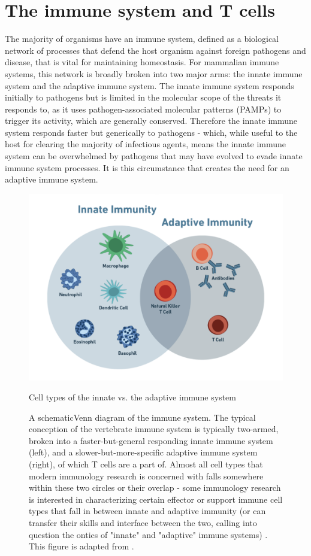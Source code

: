 \section{The immune system and T cells}
The majority of organisms have an immune system, defined as a biological network of processes that defend the host organism against foreign pathogens and disease, that is vital for maintaining homeostasis. For mammalian immune systems, this network is broadly broken into two major arms: the innate immune system and the adaptive immune system. The innate immune system responds initially to pathogens but is limited in the molecular scope of the threats it responds to, as it uses pathogen-associated molecular patterns (PAMPs) to trigger its activity, which are generally conserved. Therefore the innate immune system responds faster but generically to pathogens - which, while useful to the host for clearing the majority of infectious agents, means the innate immune system can be overwhelmed by pathogens that may have evolved to evade innate immune system processes. It is this circumstance that creates the need for an adaptive immune system.

\begin{figure}[htbp]
	\centering
	\includegraphics[width=\textwidth]{../figures/chapter1/innateadaptiveimmunesystem.png}
	\caption{Cell types of the innate vs. the adaptive immune system}
	\caption*{A schematicVenn diagram of the immune system. The typical conception of the vertebrate immune system is typically two-armed, broken into a faster-but-general responding innate immune system (left), and a slower-but-more-specific adaptive immune system (right), of which T cells are a part of.  Almost all cell types that modern immunology research is concerned with falls somewhere within these two circles or their overlap - some immunology research is interested in characterizing certain effector or support immune cell types that fall in between innate and adaptive immunity (or can transfer their skills and interface between the two, calling into question the ontics of "innate" and "adaptive" immune systems) \cite{Heidegger1962}. This figure is adapted from \cite{Alam2007}.}
	\label{fig:innateadaptiveimmunesystem}
\end{figure}

